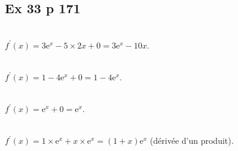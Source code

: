 \documentclass[12pt,a4paper]{book}
\begin{document}
%

\subsection*{Ex 33 p 171}
\begin{enumMet}
	\item {}\\
	$f^{\prime}(x)=3 \mathrm{e}^x-5 \times 2 x+0=3 \mathrm{e}^x-10 x$.
	\item {}\\
	$f^{\prime}(x)=1-4 \mathrm{e}^x+0=1-4 \mathrm{e}^x$.
	\item {}\\
	$f^{\prime}(x)=\mathrm{e}^x+0=\mathrm{e}^x$.
	\item {}\\
	$f^{\prime}(x)=1 \times \mathrm{e}^x+x \times \mathrm{e}^x=(1+x) \mathrm{e}^x$ (dérivée d'un produit).
\end{enumMet}
\end{document}
